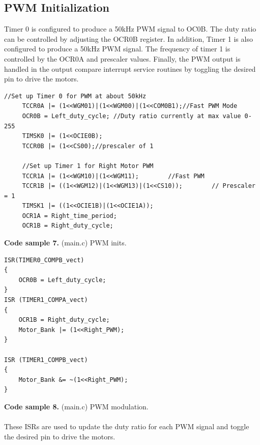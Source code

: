 \documentclass{article}
\begin{document}
\subsection{PWM Initialization}
Timer 0 is configured to produce a 50kHz PWM signal to OC0B.  The duty ratio can be controlled by adjusting the OCR0B register.  In addition, Timer 1 is also configured to produce a 50kHz PWM signal.  The frequency of timer 1 is controlled by the OCR0A and prescaler values.  Finally, the PWM output is handled in the output compare interrupt service routines by toggling the desired pin to drive the motors.
\begin{lstlisting}
//Set up Timer 0 for PWM at about 50kHz
   	 TCCR0A |= (1<<WGM01)|(1<<WGM00)|(1<<COM0B1);//Fast PWM Mode
   	 OCR0B = Left_duty_cycle; //Duty ratio currently at max value 0-255
   	 TIMSK0 |= (1<<OCIE0B);
   	 TCCR0B |= (1<<CS00);//prescaler of 1

   	 //Set up Timer 1 for Right Motor PWM
   	 TCCR1A |= (1<<WGM10)|(1<<WGM11);   	 //Fast PWM
   	 TCCR1B |= ((1<<WGM12)|(1<<WGM13)|(1<<CS10));   	 // Prescaler = 1
   	 TIMSK1 |= ((1<<OCIE1B)|(1<<OCIE1A));
   	 OCR1A = Right_time_period;
   	 OCR1B = Right_duty_cycle;

\end{lstlisting}
\textbf{Code sample 7.} (main.c) PWM inits.
\begin{lstlisting}
ISR(TIMER0_COMPB_vect)
{
    OCR0B = Left_duty_cycle;
}
ISR (TIMER1_COMPA_vect)
{
    OCR1B = Right_duty_cycle;
    Motor_Bank |= (1<<Right_PWM);
}

ISR (TIMER1_COMPB_vect)
{
    Motor_Bank &= ~(1<<Right_PWM);
}
\end{lstlisting}
\textbf{Code sample 8.} (main.c) PWM modulation. \\\\
These ISRs are used to update the duty ratio for each PWM signal and toggle the desired pin to drive the motors.
\end{document}
